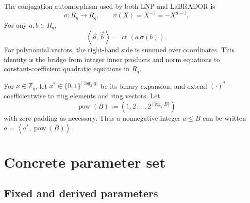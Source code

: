 \documentclass[11pt,a4paper]{article}
\newcommand{\Z}{\mathbb{Z}}
\newcommand{\ct}{\operatorname{ct}}
\newcommand{\powvec}{\operatorname{pow}}
\newcommand{\vecx}[1]{\overrightarrow{#1}}
\newcommand{\inner}[2]{\left\langle #1,#2\right\rangle}
\begin{document}
The conjugation automorphism used by both LNP and LaBRADOR is
\[
  \sigma:R_q\longrightarrow R_q,\qquad
  \sigma(X)=X^{-1}=-X^{d-1}.
\]
For any \(a,b\in R_q\),
\begin{equation}
  \inner{\vecx a}{\vecx b}
  =\ct\!\left(a\,\sigma(b)\right).
  \label{eq:ct-inner-product}
\end{equation}
For polynomial vectors, the right-hand side is summed over coordinates.  This
identity is the bridge from integer inner products and norm equations to
constant-coefficient quadratic equations in \(R_q\).

For \(x\in\Z_q\), let \(x^*\in\{0,1\}^{\lceil\log_2q\rceil}\) be its binary
expansion, and extend \((\cdot)^*\) coefficientwise to ring elements and ring
vectors.  Let
\[
  \powvec(B):=(1,2,\ldots,2^{\lceil\log_2 B\rceil})
\]
with zero padding as necessary.  Thus a nonnegative integer \(a\le B\) can be
written \(a=\inner{a^*}{\powvec(B)}\).

\section{Concrete parameter set}

\subsection{Fixed and derived parameters}
\end{document}
